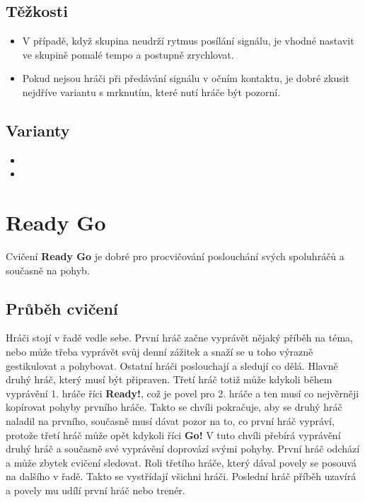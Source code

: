 \documentclass[main.tex]{subfiles}
\begin{document}
\subsection{ Těžkosti } \begin{itemize}
\item  V případě, když skupina neudrží rytmus posílání signálu, je vhodné nastavit ve skupině pomalé tempo a postupně zrychlovat.
\item  Pokud nejsou hráči při předávání signálu v očním kontaktu, je dobré zkusit nejdříve variantu s mrknutím, které nutí hráče být pozorní.
\end{itemize}
 
\subsection{Varianty} \begin{itemize}
\item {}
\item {}
\end{itemize}
 
 
 
\needspace{5cm} \section{Ready Go} \label{ready go} Cvičení \textbf{Ready Go}{} je dobré pro procvičování poslouchání svých spoluhráčů a současně na pohyb. 
 
\subsection{ Průběh cvičení } Hráči stojí v řadě vedle sebe. První hráč začne vyprávět nějaký příběh na téma, nebo může třeba vyprávět svůj denní zážitek a snaží se u toho výrazně gestikulovat a pohybovat. Ostatní hráči poslouchají a sledují co dělá. Hlavně druhý hráč, který musí být připraven. Třetí hráč totiž může kdykoli během vyprávění 1. hráče říci \textbf{Ready!}{}, což je povel pro 2. hráče a ten musí co nejvěrněji kopírovat pohyby prvního hráče. Takto se chvíli pokračuje, aby se druhý hráč naladil na prvního, současně musí dávat pozor na to, co první hráč vypráví, protože třetí hráč může opět kdykoli říci \textbf{Go!}{} V tuto chvíli přebírá vyprávění druhý hráč a současně své vyprávění doprovází svými pohyby. První hráč odchází a může zbytek cvičení sledovat. Roli třetího hráče, který dával povely se posouvá na dalšího v řadě. Takto se vystřídají všichni hráči. Poslední hráč příběh uzavírá a povely mu udílí první hráč nebo trenér. 
 
\end{document}
